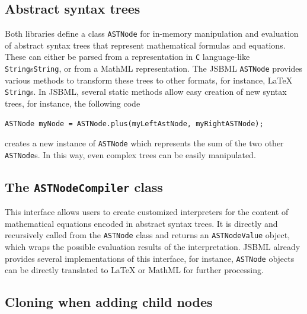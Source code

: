 \documentclass[
  BCOR12mm,
  letterpaper,
  11pt,
  headsepline,
  pointlessnumbers,
  tablecaptionabove,
  onelinecaption,
  headinclude,
  appendixprefix,
  idxtotoc,
  bibtotoc,
  twoside,
  titlepage
]{scrartcl}
\begin{document}
\subsection{Abstract syntax trees}

Both libraries define a class \texttt{ASTNode} for in-memory manipulation and
evaluation of abstract syntax trees that represent mathematical formulas and
equations. These can either be parsed from a representation in \texttt{C}
language-like \texttt{String}s\texttt{String}, or from a MathML representation. The JSBML
\texttt{ASTNode} provides various methods to transform these trees to other
formats, for instance, \LaTeX{}\index{\LaTeX} \texttt{String}s. In JSBML, several static
methods allow easy creation of new syntax trees, for instance, the following
code
\begin{lstlisting}
ASTNode myNode = ASTNode.plus(myLeftAstNode, myRightASTNode);
\end{lstlisting}
creates a new instance of \texttt{ASTNode} which represents the sum of the two
other \texttt{ASTNode}s. In this way, even complex trees can be easily
manipulated.

\subsection{The \texttt{ASTNodeCompiler} class}

This interface allows users to create customized interpreters for the
content of mathematical equations encoded in abstract syntax trees. It
is directly and recursively called from the \texttt{ASTNode} class and returns
an \texttt{ASTNodeValue} object, which wraps the possible evaluation results of
the interpretation. JSBML already provides several implementations of
this interface, for instance, \texttt{ASTNode} objects can be directly translated
to \LaTeX{}\index{\LaTeX} or MathML for further processing.

\subsection{Cloning when adding child nodes}
\end{document}
